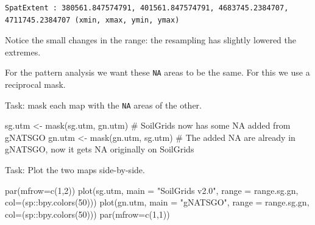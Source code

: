 \documentclass[
  letterpaper,
  DIV=11,
  numbers=noendperiod]{scrartcl}
\newenvironment{Shaded}{\begin{snugshade}}{\end{snugshade}}
\newcommand{\AttributeTok}[1]{\textcolor[rgb]{0.40,0.45,0.13}{#1}}
\newcommand{\CommentTok}[1]{\textcolor[rgb]{0.37,0.37,0.37}{#1}}
\newcommand{\DecValTok}[1]{\textcolor[rgb]{0.68,0.00,0.00}{#1}}
\newcommand{\FunctionTok}[1]{\textcolor[rgb]{0.28,0.35,0.67}{#1}}
\newcommand{\NormalTok}[1]{\textcolor[rgb]{0.00,0.23,0.31}{#1}}
\newcommand{\OtherTok}[1]{\textcolor[rgb]{0.00,0.23,0.31}{#1}}
\newcommand{\SpecialCharTok}[1]{\textcolor[rgb]{0.37,0.37,0.37}{#1}}
\newcommand{\StringTok}[1]{\textcolor[rgb]{0.13,0.47,0.30}{#1}}
\begin{document}
\begin{verbatim}
SpatExtent : 380561.847574791, 401561.847574791, 4683745.2384707, 4711745.2384707 (xmin, xmax, ymin, ymax)
\end{verbatim}

Notice the small changes in the range: the resampling has slightly
lowered the extremes.

For the pattern analysis we want these \texttt{NA} areas to be the same.
For this we use a reciprocal mask.

Task: mask each map with the \texttt{NA} areas of the other.

\begin{Shaded}
\begin{Highlighting}[]
\NormalTok{sg.utm }\OtherTok{\textless{}{-}} \FunctionTok{mask}\NormalTok{(sg.utm, gn.utm)}
\CommentTok{\# SoilGrids now has some \textasciigrave{}NA\textasciigrave{} added from gNATSGO}
\NormalTok{gn.utm }\OtherTok{\textless{}{-}} \FunctionTok{mask}\NormalTok{(gn.utm, sg.utm)}
\CommentTok{\# The added \textasciigrave{}NA\textasciigrave{} are already in gNATSGO, now it gets \textasciigrave{}NA\textasciigrave{} originally on SoilGrids}
\end{Highlighting}
\end{Shaded}

Task: Plot the two maps side-by-side.

\begin{Shaded}
\begin{Highlighting}[]
\FunctionTok{par}\NormalTok{(}\AttributeTok{mfrow=}\FunctionTok{c}\NormalTok{(}\DecValTok{1}\NormalTok{,}\DecValTok{2}\NormalTok{))}
\FunctionTok{plot}\NormalTok{(sg.utm, }\AttributeTok{main =} \StringTok{"SoilGrids v2.0"}\NormalTok{, }
     \AttributeTok{range =}\NormalTok{ range.sg.gn, }\AttributeTok{col=}\NormalTok{(sp}\SpecialCharTok{::}\FunctionTok{bpy.colors}\NormalTok{(}\DecValTok{50}\NormalTok{)))}
\FunctionTok{plot}\NormalTok{(gn.utm, }\AttributeTok{main =} \StringTok{"gNATSGO"}\NormalTok{, }
     \AttributeTok{range =}\NormalTok{ range.sg.gn, }\AttributeTok{col=}\NormalTok{(sp}\SpecialCharTok{::}\FunctionTok{bpy.colors}\NormalTok{(}\DecValTok{50}\NormalTok{)))}
\FunctionTok{par}\NormalTok{(}\AttributeTok{mfrow=}\FunctionTok{c}\NormalTok{(}\DecValTok{1}\NormalTok{,}\DecValTok{1}\NormalTok{))}
\end{Highlighting}
\end{Shaded}
\end{document}
